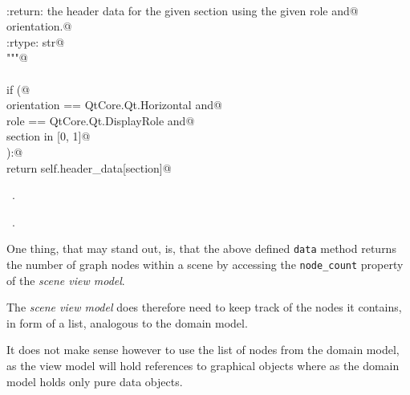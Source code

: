 \documentclass[
    a4paper,      %
    10pt,         %
    openright,    %
    notitlepage,  %
    parskip=half, %
]{scrreprt}       %
\theoremstyle{definition}                    %
\begin{document}
\begin{flushleft}
\begin{minipage}{\linewidth}
\begin{list}{}{}
\mbox{}\lstinline@@\\
\mbox{}\lstinline@    :return: the header data for the given section using the given role and@\\
\mbox{}\lstinline@             orientation.@\\
\mbox{}\lstinline@    :rtype:  str@\\
\mbox{}\lstinline@    """@\\
\mbox{}\lstinline@@\\
\mbox{}\lstinline@    if (@\\
\mbox{}\lstinline@            orientation == QtCore.Qt.Horizontal  and@\\
\mbox{}\lstinline@            role        == QtCore.Qt.DisplayRole and@\\
\mbox{}\lstinline@            section     in [0, 1]@\\
\mbox{}\lstinline@    ):@\\
\mbox{}\lstinline@        return self.header_data[section]@\\
\mbox{}\lstinline@@{\NWsep}
\end{list}
\vspace{-1.5ex}
\footnotesize
\begin{list}{}{\setlength{\itemsep}{-\parsep}\setlength{\itemindent}{-\leftmargin}}
\item \NWtxtMacroDefBy\ .
\item \NWtxtMacroRefIn\ .

\item{}
\end{list}
\end{minipage}\vspace{4ex}
\end{flushleft}
One thing, that may stand out, is, that the above defined \verb+data+ method
returns the number of graph nodes within a scene by accessing the
\verb+node_count+ property of the \textit{scene view model}.

The \textit{scene view model} does therefore need to keep track of the nodes it
contains, in form of a list, analogous to the domain model.

It does not make sense however to use the list of nodes from the domain model,
as the view model will hold references to graphical objects where as the domain
model holds only pure data objects.
\end{document}
